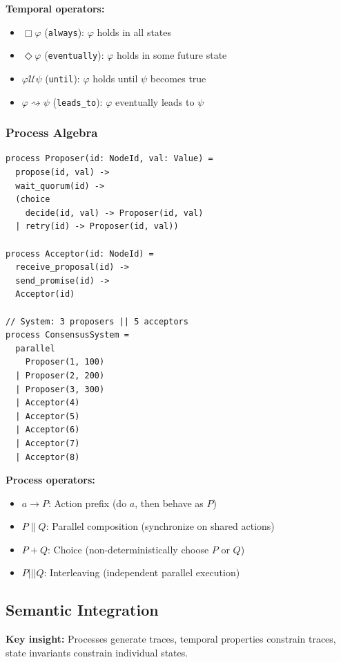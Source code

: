 \documentclass[conference]{IEEEtran}
\begin{document}
\textbf{Temporal operators:}
\begin{itemize}
\item $\Box\varphi$ (\texttt{always}): $\varphi$ holds in all states
\item $\Diamond\varphi$ (\texttt{eventually}): $\varphi$ holds in some future state
\item $\varphi \mathbin{\mathcal{U}} \psi$ (\texttt{until}): $\varphi$ holds until $\psi$ becomes true
\item $\varphi \rightsquigarrow \psi$ (\texttt{leads\_to}): $\varphi$ eventually leads to $\psi$
\end{itemize}

\subsubsection{Process Algebra}

\begin{lstlisting}[caption={Process composition}]
process Proposer(id: NodeId, val: Value) =
  propose(id, val) ->
  wait_quorum(id) ->
  (choice
    decide(id, val) -> Proposer(id, val)
  | retry(id) -> Proposer(id, val))

process Acceptor(id: NodeId) =
  receive_proposal(id) ->
  send_promise(id) ->
  Acceptor(id)

// System: 3 proposers || 5 acceptors
process ConsensusSystem =
  parallel
    Proposer(1, 100)
  | Proposer(2, 200)
  | Proposer(3, 300)
  | Acceptor(4)
  | Acceptor(5)
  | Acceptor(6)
  | Acceptor(7)
  | Acceptor(8)
\end{lstlisting}

\textbf{Process operators:}
\begin{itemize}
\item $a \to P$: Action prefix (do $a$, then behave as $P$)
\item $P \parallel Q$: Parallel composition (synchronize on shared actions)
\item $P + Q$: Choice (non-deterministically choose $P$ or $Q$)
\item $P \mathbin{|||} Q$: Interleaving (independent parallel execution)
\end{itemize}

\subsection{Semantic Integration}

\textbf{Key insight:} Processes generate traces, temporal properties constrain traces, state invariants constrain individual states.
\end{document}
